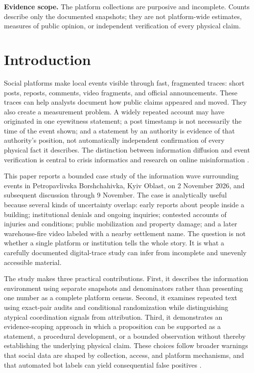 \noindent\textbf{Evidence scope.} The platform collections are purposive and incomplete. Counts describe only the documented snapshots; they are not platform-wide estimates, measures of public opinion, or independent verification of every physical claim.

\section{Introduction}

Social platforms make local events visible through fast, fragmented traces: short posts, reposts, comments, video fragments, and official announcements. These traces can help analysts document how public claims appeared and moved. They also create a measurement problem. A widely repeated account may have originated in one eyewitness statement; a post timestamp is not necessarily the time of the event shown; and a statement by an authority is evidence of that authority's position, not automatically independent confirmation of every physical fact it describes. The distinction between information diffusion and event verification is central to crisis informatics and research on online misinformation \citep{lazer2018science,vosoughi2018spread,han2019rumour}.

This paper reports a bounded case study of the information wave surrounding events in Petropavlivska Borshchahivka, Kyiv Oblast, on 2 November 2026, and subsequent discussion through 9 November. The case is analytically useful because several kinds of uncertainty overlap: early reports about people inside a building; institutional denials and ongoing inquiries; contested accounts of injuries and conditions; public mobilization and property damage; and a later warehouse-fire video labeled with a nearby settlement name. The question is not whether a single platform or institution tells the whole story. It is what a carefully documented digital-trace study can infer from incomplete and unevenly accessible material.

The study makes three practical contributions. First, it describes the information environment using separate snapshots and denominators rather than presenting one number as a complete platform census. Second, it examines repeated text using exact-pair audits and conditional randomization while distinguishing atypical coordination signals from attribution. Third, it demonstrates an evidence-scoping approach in which a proposition can be supported as a statement, a procedural development, or a bounded observation without thereby establishing the underlying physical claim. These choices follow broader warnings that social data are shaped by collection, access, and platform mechanisms, and that automated bot labels can yield consequential false positives \citep{olteanu2019social,rauchfleisch2020false,vicente2023sampling}.

